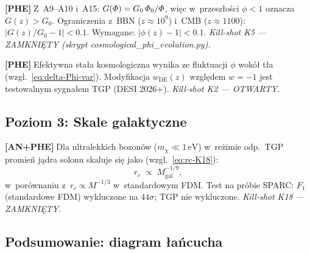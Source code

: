 \begin{chain}\label{chain:A16}
  \textbf{[PHE]}$\;$Z~A9--A10 i~A15: $G(\varPhi) = G_0\,\varPhi_0/\varPhi$,
  wi\k{e}c w~przesz\l{}o\'sci $\phi < 1$ oznacza $G(z) > G_0$.
  Ograniczenia z~BBN ($z \approx 10^9$) i~CMB ($z \approx 1100$):
  $|G(z)/G_0 - 1| < 0.1$.
  Wymagane: $|\phi(z)-1| < 0.1$.
  \emph{Kill-shot K5 --- ZAMKNI\k{E}TY (skrypt cosmological\_phi\_evolution.py).}
\end{chain}

\begin{chain}\label{chain:A17}
  \textbf{[PHE]}$\;$Efektywna sta\l{}a kosmologiczna wynika
  ze fluktuacji $\phi$ wok\'o\l{} t\l{}a (wzgl.~\eqref{eq:delta-Phi-var}).
  Modyfikacja $w_{\mathrm{DE}}(z)$ wzgl\k{e}dem $w=-1$
  jest testowalnym sygna\l{}em TGP (DESI 2026+).
  \emph{Kill-shot K2 --- OTWARTY.}
\end{chain}

\subsection{Poziom 3: Skale galaktyczne}%
\label{app:H-galaktyki}

\begin{chain}\label{chain:A18}
  \textbf{[AN+PHE]}$\;$Dla ultralekkich bozon\'ow ($m_\chi \ll 1\,\mathrm{eV}$)
  w~re\.zimie odp.~TGP promie\'n j\k{a}dra solonu skaluje si\k{e} jako
  (wzgl.~\eqref{eq:rc-K18}):
  \begin{equation}\label{eq:H-rc}
    r_c \;\propto\; M_{\mathrm{gal}}^{-1/9},
  \end{equation}
  w~por\'ownaniu z~$r_c \propto M^{-1/3}$ w~standardowym FDM.
  Test na pr\'obie SPARC: $F_1$\,(standardowe FDM) wykluczone
  na $44\sigma$; TGP nie wykluczone.
  \emph{Kill-shot K18 --- ZAMKNI\k{E}TY.}
\end{chain}

\subsection{Podsumowanie: diagram \l{}a\'ncucha}%
\label{app:H-diagram}

